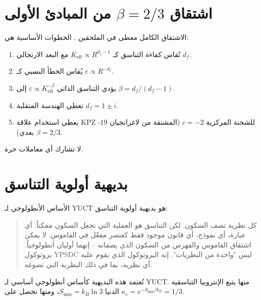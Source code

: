 \documentclass[11pt,a4paper]{article}
\begin{document}
	\appendix
	\section{اشتقاق \(\beta = 2/3\) من المبادئ الأولى}
	\label{app:beta_derivation}
	الاشتقاق الكامل معطى في الملحقين \cite{AppendixL, AppendixY}. الخطوات الأساسية هي:
	\begin{enumerate}
		\item تُقاس كفاءة التناسق كـ \(K_{\mathrm{eff}} \propto R^{d_f-1}\) مع البعد الارتجالي \(d_f\).
		\item يُقاس الخطأ النسبي كـ \(\varepsilon \propto R^{-d_f}\).
		\item يؤدي التناسق الذاتي \(\varepsilon \propto K_{\mathrm{eff}}^{-\beta}\) إلى \(\beta = d_f/(d_f-1)\).
		\item تعطي الهندسة المتقلبة \(d_f = 1 \pm i\).
		\item يعطي استخدام علاقة KPZ للشحنة المركزية \(c = -2\) (المشتقة من لاغرانجيان 19-بعدي) \(\beta = 2/3\).
	\end{enumerate}
	لا تشارك أي معاملات حرة.
	
	\section{بديهية أولوية التناسق}
	\label{app:axiom}
	الأساس الأنطولوجي لـ YUCT هو بديهية أولوية التناسق:
	\begin{quote}
		كل نظرية تصف السكون. لكن التناسق هو العملية التي تجعل السكون ممكناً. أي عبارة، أي نموذج، أي قانون موجود فقط كعنصر مفعّل في القاموس. لا يمكن اشتقاق القاموس والفهرس من السكون الذي يصفانه -- إنهما أوليان أنطولوجياً. بروتوكول YPSDC ليس "واحدة من النظريات". إنه البروتوكول الذي يقوم عليه أي نظرية، بما في ذلك النظرية التي تصوغه.
	\end{quote}
	تُعتمد هذه البديهية كأساس أنطولوجي أساسي لـ YUCT. منها يتبع الإنتروبيا التناسقية الدنيا \(S_{\min} = k_B \ln 3\)، ومنها نحصل على \(\kappa_c = e^{-S_{\min}/k_B} = 1/3\).
	
\end{document}

